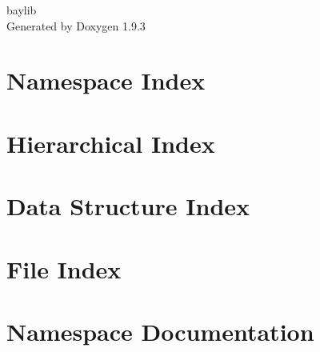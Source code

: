 \documentclass[twoside]{book}
\newcommand{\+}{\discretionary{\mbox{\scriptsize$\hookleftarrow$}}{}{}}
\newcommand{\clearemptydoublepage}{%
    \newpage{\pagestyle{empty}\cleardoublepage}%
  }
\begin{document}
  \raggedbottom
    \hypersetup{pageanchor=false,
                bookmarksnumbered=true,
                pdfencoding=unicode
               }
  \begin{titlepage}
  \vspace*{7cm}
  \begin{center}%
  {\Large baylib}\\
  \vspace*{1cm}
  {\large Generated by Doxygen 1.9.3}\\
  \end{center}
  \end{titlepage}
  \clearemptydoublepage
  \tableofcontents
  \clearemptydoublepage
  \hypersetup{pageanchor=true}
\chapter{Namespace Index}

\chapter{Hierarchical Index}

\chapter{Data Structure Index}

\chapter{File Index}

\chapter{Namespace Documentation}

\end{document}
